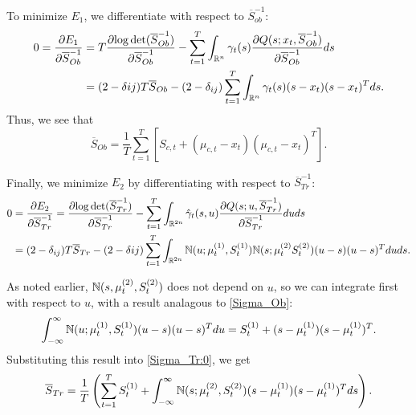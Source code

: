 \documentclass[12pt,leqno]{article}
\begin{document}
To minimize $E_1$, we differentiate with respect to $\overline{S}_{ob}^{-1}$:
\begin{align*}
  0 = \frac{\partial{E_1}}{\partial{\overline{S}_{Ob}^{-1}}} &= T\frac{\partial{\log\det(\overline{S}_{Ob}^{-1})}}{\partial\overline{S}_{Ob}^{-1}}
  - \sum_{t=1}^T\int_{{\mathbb R}^n}\gamma_t(s)\frac{\partial{Q(s;x_t,\overline{S}_{Ob}^{-1})}}{\partial{\overline{S}_{Ob}^{-1}}}ds \\
  &= (2-\delta{ij})T\overline{S}_{Ob} - (2-\delta_{ij})\sum_{t=1}^T\int_{{\mathbb R}^n}\gamma_t(s)(s-x_t)(s-x_t)^Tds.
\end{align*}
Thus,  we see that
\begin{equation}\label{Sigma_Ob}
  \overline{S}_{Ob} = \frac{1}{T}\sum_{t=1}^T [S_{c,t} + (\mu_{c,t}-x_t)(\mu_{c,t}-x_t)^T].
\end{equation}

Finally, we minimize $E_2$ by differentiating with respect to $\overline{S}_{Tr}^{-1}$:
\begin{equation}\label{Sigma_Tr:0}
  \begin{split}
  0 &= \frac{\partial{E_2}}{\partial{\overline{S}_{Tr}^{-1}}} = \frac{\partial{\log\det(\overline{S}_{Tr}^{-1})}}{\partial\overline{S}_{Tr}^{-1}}
  - \sum_{t=1}^T\int_{{\mathbb R}^{2n}}\hat{\gamma}_t(s,u)\frac{\partial{Q(s;u,\overline{S}_{Tr}^{-1})}}{\partial\overline{S}_{Tr}^{-1}}duds \\
      &= (2-\delta_{ij})T\overline{S}_{Tr} - (2-\delta{ij}) \sum_{t=1}^T\int_{{\mathbb R}^{2n}}{\mathbb N}(u;\mu^{(1)}_t,S^{(1)}_t){\mathbb N}(s;\mu^{(2)}_tS^{(2)}_t)(u-s)(u-s)^Tduds.
  \end{split}
\end{equation}

As noted earlier, ${\mathbb N}(s,\mu^{(2)}_t,S^{(2)}_t)$ does not depend on $u$, so we can integrate first with respect to $u$, with a result
analagous to \eqref{Sigma_Ob}:
$$
  \int_{-\infty}^{\infty}{\mathbb N}(u;\mu^{(1)}_t,S^{(1)}_t)(u-s)(u-s)^Tdu = S^{(1)}_t + (s-\mu^{(1)}_t)(s-\mu^{(1)}_t)^T.
$$
Substituting this result into \eqref{Sigma_Tr:0}, we get
\begin{equation}\label{Sigma_Tr:1}
  \overline{S}_{Tr} =  \frac{1}{T}\left(\sum_{t=1}^TS^{(1)}_t +\int_{-\infty}^{\infty}{\mathbb N}(s;\mu^{(2)}_t,S^{(2)}_t)
  (s-\mu^{(1)}_t)(s-\mu^{(1)}_t)^Tds\right).
\end{equation}
\end{document}
